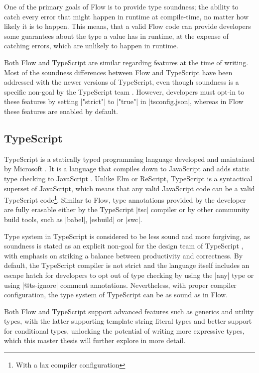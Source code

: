 One of the primary goals of Flow is to provide type soundness; the ability to catch every error that might happen in runtime at compile-time, no matter how likely it is to happen. This means, that a valid Flow code can provide developers some guarantees about the type a value has in runtime, at the expense of catching errors, which are unlikely to happen in runtime.

Both Flow and TypeScript are similar regarding features at the time of writing. Most of the soundness differences between Flow and TypeScript have been addressed with the newer versions of TypeScript, even though soundness is a specific non-goal by the TypeScript team \cite{TypeScriptDesignGoals}. However, developers must opt-in to these features by setting \code|"strict"| to \code|"true"| in \code|tsconfig.json|, whereas in Flow these features are enabled by default.

\subsection{TypeScript}

TypeScript is a statically typed programming language developed and maintained by Microsoft \cite{TypeScriptJavaScriptSyntax}. It is a language that compiles down to JavaScript and adds static type checking to JavaScript \cite{DocumentationTypeScriptJavaScript}. Unlike Elm or ReScript, TypeScript is a syntactical superset of JavaScript, which means that any valid JavaScript code can be a valid TypeScript code\footnote{With a lax compiler configuration}. Similar to Flow, type annotations provided by the developer are fully erasable either by the TypeScript \code|tsc| compiler or by other community build tools, such as \code|babel|\cite{BabelCompilerNext}, \code|esbuild|\cite{EsbuildExtremelyFast} or \code|swc|\cite{SWCRustbasedPlatform}.

Type system in TypeScript is considered to be less sound and more forgiving, as soundness is stated as an explicit non-goal for the design team of TypeScript \cite{TypeScriptDesignGoals}, with emphasis on striking a balance between productivity and correctness. By default, the TypeScript compiler is not strict and the language itself includes an escape hatch for developers to opt out of type checking by using the \code|any| type or using \code|@ts-ignore| comment annotations. Nevertheless, with proper compiler configuration, the type system of TypeScript can be as sound as in Flow.

Both Flow and TypeScript support advanced features such as generics and utility types, with the latter supporting template string literal types and better support for conditional types, unlocking the potential of writing more expressive types, which this master thesis will further explore in more detail.

